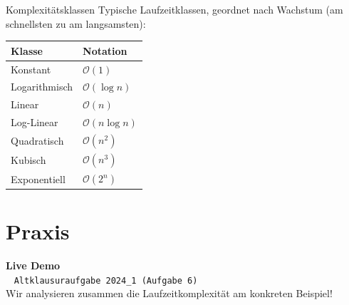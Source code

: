 \documentclass[aspectratio=169,11pt]{beamer}
\begin{document}
\begin{frame}{Komplexitätsklassen}
    Typische Laufzeitklassen, geordnet nach Wachstum (am schnellsten zu am langsamsten):
    
    \vspace{0.3cm}
    \begin{tabular}{ll}
        \toprule
        \textbf{Klasse} & \textbf{Notation} \\
        \midrule
        Konstant & $\mathcal{O}(1)$ \\
        Logarithmisch & $\mathcal{O}(\log n)$ \\
        Linear & $\mathcal{O}(n)$ \\
        Log-Linear & $\mathcal{O}(n \log n)$ \\
        Quadratisch & $\mathcal{O}(n^2)$ \\
        Kubisch & $\mathcal{O}(n^3)$ \\
        Exponentiell & $\mathcal{O}(2^n)$ \\
        \bottomrule
    \end{tabular}
\end{frame}


\section{Praxis}

\begin{frame}[plain]
    \begin{center}
        \Huge \textbf{Live Demo} \\
        \vspace{0.5cm}
        \large \faPen~ \texttt{Altklausuraufgabe 2024\_1 (Aufgabe 6)} \\
        \vspace{0.3cm}
        \normalsize Wir analysieren zusammen die Laufzeitkomplexität am konkreten Beispiel!
\vspace{0.5cm}\begin{center}\href{https://moodle.uni-ulm.de/pluginfile.php/1348606/mod_folder/content/0/2024_1_exam.pdf}{}\end{center}
    \end{center}
\end{frame}
\end{document}
